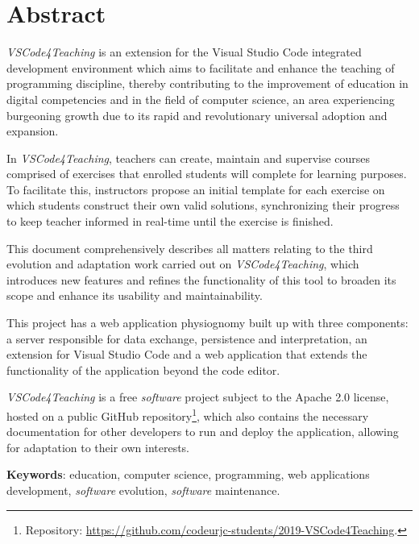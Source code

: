 \chapter*{Abstract}

\textit{VSCode4Teaching} is an extension for the Visual Studio Code integrated development environment which aims to facilitate and enhance the teaching of programming discipline, thereby contributing to the improvement of education in digital competencies and in the field of computer science, an area experiencing burgeoning growth due to its rapid and revolutionary universal adoption and expansion.

In \textit{VSCode4Teaching}, teachers can create, maintain and supervise courses comprised of exercises that enrolled students will complete for learning purposes. To facilitate this, instructors propose an initial template for each exercise on which students construct their own valid solutions, synchronizing their progress to keep teacher informed in real-time until the exercise is finished.

This document comprehensively describes all matters relating to the third evolution and adaptation work carried out on \textit{VSCode4Teaching}, which introduces new features and refines the functionality of this tool to broaden its scope and enhance its usability and maintainability.

This project has a web application physiognomy built up with three components: a server responsible for data exchange, persistence and interpretation, an extension for Visual Studio Code and a web application that extends the functionality of the application beyond the code editor.

\textit{VSCode4Teaching} is a free \textit{software} project subject to the Apache 2.0 license, hosted on a public GitHub repository\footnote{Repository: \href{https://github.com/codeurjc-students/2019-VSCode4Teaching}{https://github.com/codeurjc-students/2019-VSCode4Teaching}.}, which also contains the necessary documentation for other developers to run and deploy the application, allowing for adaptation to their own interests.

\vspace{2pt}

\noindent \textbf{Keywords}: education, computer science, programming, web applications development, \textit{software} evolution, \textit{software} maintenance.